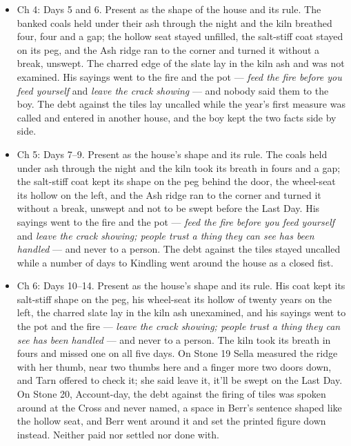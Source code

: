 \documentclass{design/chronicle}
\begin{document}
{\begin{itemize}[leftmargin=1.4em,itemsep=1pt,topsep=3pt,parsep=0pt]
\end{itemize}

\begin{itemize}[leftmargin=1.4em,itemsep=1pt,topsep=3pt,parsep=0pt]

\item Ch 4: Days 5 and 6. Present as the shape of the house and its rule. The banked coals held under their ash through the night and the kiln breathed four, four and a gap; the hollow seat stayed unfilled, the salt-stiff coat stayed on its peg, and the Ash ridge ran to the corner and turned it without a break, unswept. The charred edge of the slate lay in the kiln ash and was not examined. His sayings went to the fire and the pot --- \emph{feed the fire before you feed yourself} and \emph{leave the crack showing} --- and nobody said them to the boy. The debt against the tiles lay uncalled while the year’s first measure was called and entered in another house, and the boy kept the two facts side by side.

\end{itemize}

\begin{itemize}[leftmargin=1.4em,itemsep=1pt,topsep=3pt,parsep=0pt]

\item Ch 5: Days 7--9. Present as the house’s shape and its rule. The coals held under ash through the night and the kiln took its breath in fours and a gap; the salt-stiff coat kept its shape on the peg behind the door, the wheel-seat its hollow on the left, and the Ash ridge ran to the corner and turned it without a break, unswept and not to be swept before the Last Day. His sayings went to the fire and the pot --- \emph{feed the fire before you feed yourself} and \emph{leave the crack showing; people trust a thing they can see has been handled} --- and never to a person. The debt against the tiles stayed uncalled while a number of days to Kindling went around the house as a closed fist.

\end{itemize}

\begin{itemize}[leftmargin=1.4em,itemsep=1pt,topsep=3pt,parsep=0pt]

\item Ch 6: Days 10--14. Present as the house’s shape and its rule. His coat kept its salt-stiff shape on the peg, his wheel-seat its hollow of twenty years on the left, the charred slate lay in the kiln ash unexamined, and his sayings went to the pot and the fire --- \emph{leave the crack showing; people trust a thing they can see has been handled} --- and never to a person. The kiln took its breath in fours and missed one on all five days. On Stone 19 Sella measured the ridge with her thumb, near two thumbs here and a finger more two doors down, and Tarn offered to check it; she said leave it, it’ll be swept on the Last Day. On Stone 20, Account-day, the debt against the firing of tiles was spoken around at the Cross and never named, a space in Berr’s sentence shaped like the hollow seat, and Berr went around it and set the printed figure down instead. Neither paid nor settled nor done with.


\end{itemize}}
\end{document}
